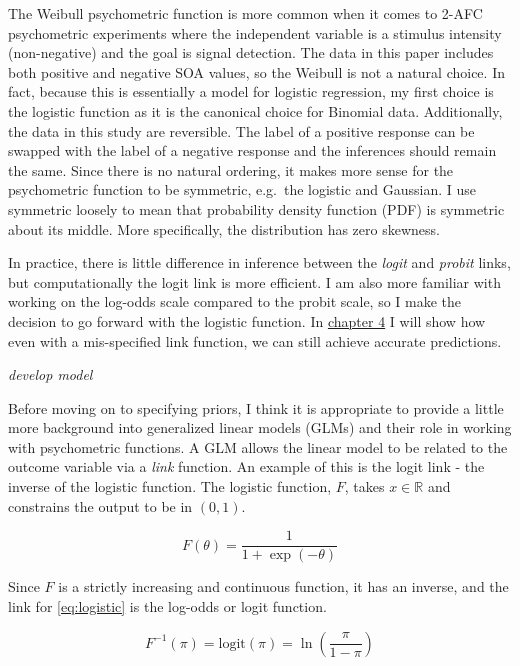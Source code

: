 \documentclass[11pt, oneside, openany]{scrbook}
\begin{document}
The Weibull psychometric function is more common when it comes to 2-AFC psychometric experiments where the independent variable is a stimulus intensity (non-negative) and the goal is signal detection. The data in this paper includes both positive and negative SOA values, so the Weibull is not a natural choice. In fact, because this is essentially a model for logistic regression, my first choice is the logistic function as it is the canonical choice for Binomial data. Additionally, the data in this study are reversible. The label of a positive response can be swapped with the label of a negative response and the inferences should remain the same. Since there is no natural ordering, it makes more sense for the psychometric function to be symmetric, e.g.~the logistic and Gaussian. I use symmetric loosely to mean that probability density function (PDF) is symmetric about its middle. More specifically, the distribution has zero skewness.

In practice, there is little difference in inference between the \emph{logit} and \emph{probit} links, but computationally the logit link is more efficient. I am also more familiar with working on the log-odds scale compared to the probit scale, so I make the decision to go forward with the logistic function. In \protect\hyperlink{model-checking}{chapter 4} I will show how even with a mis-specified link function, we can still achieve accurate predictions.

\emph{develop model}

Before moving on to specifying priors, I think it is appropriate to provide a little more background into generalized linear models (GLMs) and their role in working with psychometric functions. A GLM allows the linear model to be related to the outcome variable via a \emph{link} function. An example of this is the logit link - the inverse of the logistic function. The logistic function, \(F\), takes \(x \in \mathbb{R}\) and constrains the output to be in \((0, 1)\).

\begin{equation}
  F(\theta) = \frac{1}{1 + \exp\left(-\theta\right)}
  \label{eq:logistic}
\end{equation}

Since \(F\) is a strictly increasing and continuous function, it has an inverse, and the link for \eqref{eq:logistic} is the log-odds or logit function.

\begin{equation}
  F^{-1}(\pi) = \mathrm{logit}(\pi) = \ln\left(\frac{\pi}{1 - \pi}\right)
  \label{eq:logit}
\end{equation}
\end{document}
